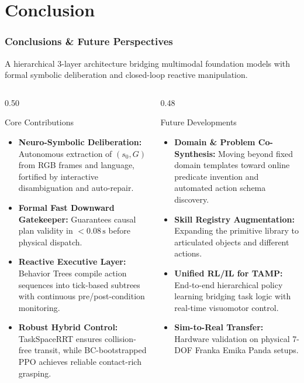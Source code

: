 \documentclass[10pt]{beamer}
\begin{document}
\section{Conclusion}
\begin{frame}[t]
    \frametitle{Conclusions \& Future Perspectives}
    \footnotesize
    A hierarchical 3-layer architecture bridging multimodal foundation models with formal symbolic deliberation and closed-loop reactive manipulation.

    \vspace{0.1cm}
    \begin{columns}[T]
        \begin{column}{0.50\textwidth}
            \begin{block}{Core Contributions}
                \begin{itemize}\scriptsize
                    \item \textbf{Neuro-Symbolic Deliberation:} Autonomous extraction of $(s_0, G)$ from RGB frames and language, fortified by interactive disambiguation and auto-repair.
                    \item \textbf{Formal Fast Downward Gatekeeper:} Guarantees causal plan validity in $<0.08\,\text{s}$ before physical dispatch.
                    \item \textbf{Reactive Executive Layer:} Behavior Trees compile action sequences into tick-based subtrees with continuous pre/post-condition monitoring.
                    \item \textbf{Robust Hybrid Control:} TaskSpaceRRT ensures collision-free transit, while BC-bootstrapped PPO achieves reliable contact-rich grasping.
                \end{itemize}
            \end{block}
        \end{column}

        \begin{column}{0.48\textwidth}
            \begin{block}{Future Developments}
                \begin{itemize}\scriptsize
                    \item \textbf{Domain \& Problem Co-Synthesis:} Moving beyond fixed domain templates toward online predicate invention and automated action schema discovery.
                    \item \textbf{Skill Registry Augmentation:} Expanding the primitive library to articulated objects and different actions.
                    \item \textbf{Unified RL/IL for TAMP:} End-to-end hierarchical policy learning bridging task logic with real-time visuomotor control.
                    \item \textbf{Sim-to-Real Transfer:} Hardware validation on physical 7-DOF Franka Emika Panda setups.
                \end{itemize}
            \end{block}
        \end{column}
    \end{columns}
\end{frame}
\end{document}
